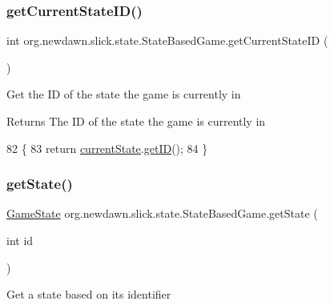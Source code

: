 \subsubsection{\texorpdfstring{get\+Current\+State\+I\+D()}{getCurrentStateID()}}
{\footnotesize\ttfamily int org.\+newdawn.\+slick.\+state.\+State\+Based\+Game.\+get\+Current\+State\+ID (\begin{DoxyParamCaption}{ }\end{DoxyParamCaption})\hspace{0.3cm}{\ttfamily [inline]}}

Get the ID of the state the game is currently in

\begin{DoxyReturn}{Returns}
The ID of the state the game is currently in 
\end{DoxyReturn}

\begin{DoxyCode}
82                                    \{
83         \textcolor{keywordflow}{return} \mbox{\hyperlink{classorg_1_1newdawn_1_1slick_1_1state_1_1_state_based_game_a6a45e68094bb9b7ec30b8a8b7d415766}{currentState}}.\mbox{\hyperlink{interfaceorg_1_1newdawn_1_1slick_1_1state_1_1_game_state_a54f2bc6a91feaf0614a5ef19f1d03313}{getID}}();
84     \}
\end{DoxyCode}
\mbox{\label{classorg_1_1newdawn_1_1slick_1_1state_1_1_state_based_game_a97fd8b52df599a2eddc2c52328a60601}} 
\subsubsection{\texorpdfstring{get\+State()}{getState()}}
{\footnotesize\ttfamily \mbox{\hyperlink{interfaceorg_1_1newdawn_1_1slick_1_1state_1_1_game_state}{Game\+State}} org.\+newdawn.\+slick.\+state.\+State\+Based\+Game.\+get\+State (\begin{DoxyParamCaption}\item[{int}]{id }\end{DoxyParamCaption})\hspace{0.3cm}{\ttfamily [inline]}}

Get a state based on it\textquotesingle{}s identifier


